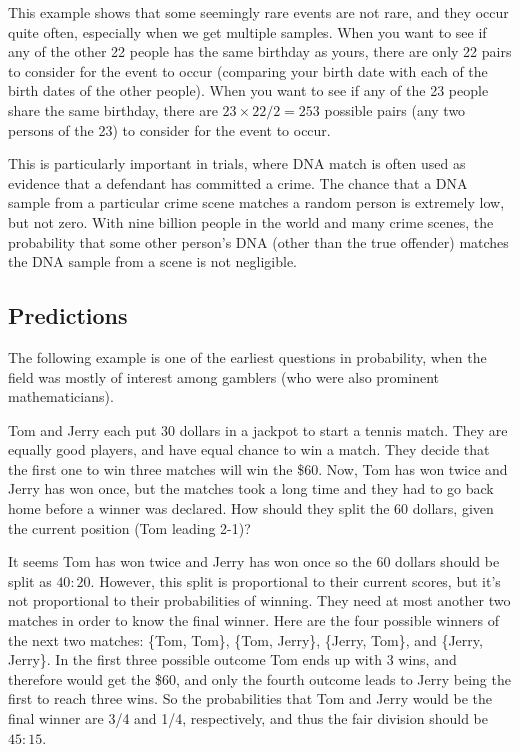 This example shows that some seemingly rare events are not rare, and they occur
quite often, especially when we get multiple samples. %
When you want to see if any of the other 22
people has the same birthday as yours, there are only 22 pairs to consider for
the event to occur (comparing your birth date with each of the birth dates of
the other people). When you want to see if
any of the 23 people share the same birthday, there are $23\times22/2=253$ possible pairs
(any two persons of the 23) to consider for the event to occur.

This is particularly important in trials, where DNA match is often
used as evidence that a defendant has committed a crime. The chance that a DNA
sample from a particular crime scene matches a random person is extremely low,
but not zero. With nine billion people in the world and many crime scenes, the
probability that some other person's DNA (other than the true offender) matches
the DNA sample from a scene is not negligible.

\subsection{Predictions}
The following example is one of the earliest questions in probability, when the
field was mostly of interest among gamblers (who were also prominent
mathematicians).

\begin{example}
Tom and Jerry each put 30 dollars in a jackpot to start a tennis match. They are
equally good players, and have equal chance to win a match. They decide that the
first one to win three matches will win the \$60.  Now, Tom has won twice and
Jerry has won once, but the matches took a long time and they had to go back
home before a winner was declared. How should they split the 60 dollars, given
the current position (Tom leading 2-1)?
\end{example}

It seems Tom has won twice and Jerry has won once so the 60 dollars should be
split as $40:20$. However, this split is proportional to their current scores, but
it's not proportional to their probabilities of
winning. They need at most another two matches in order to know the final
winner. Here are the four possible winners of the next two matches: \{Tom,
Tom\}, \{Tom, Jerry\},
\{Jerry, Tom\}, and \{Jerry, Jerry\}. In the first three possible outcome Tom
ends up with 3 wins, and therefore would get the \$60, and only the fourth
outcome leads to Jerry being the first to reach three wins.
So the probabilities that Tom and Jerry would be the final winner are 3/4 and
1/4, respectively, and thus the fair division should be $45:15$.

